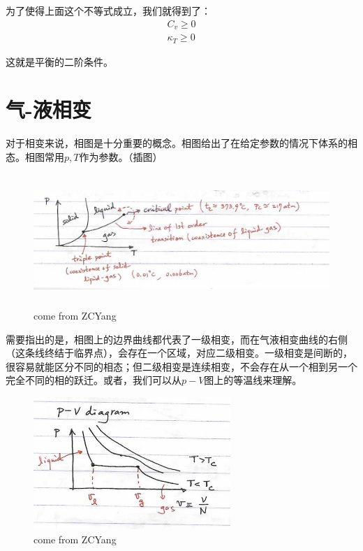 \documentclass[a4paper, 10pt, openany]{book}%
\begin{document}
 为了使得上面这个不等式成立，我们就得到了：
 \begin{align}
  C_v\geq0\\
  \kappa_T\geq0
 \end{align}

这就是平衡的二阶条件。


















\section{气-液相变}
对于相变来说，相图是十分重要的概念。相图给出了在给定参数的情况下体系的相态。相图常用$p,T$作为参数。（插图）

\begin{figure}[h]
  \centering 
  \includegraphics[height=5.0cm]{6.png}
  \caption{come from ZCYang}
\end{figure}

需要指出的是，相图上的边界曲线都代表了一级相变，而在气液相变曲线的右侧（这条线终结于临界点），会存在一个区域，对应二级相变。一级相变是间断的，很容易就能区分不同的相态；但二级相变是连续相变，不会存在从一个相到另一个完全不同的相的跃迁。或者，我们可以从$p-V$图上的等温线来理解。

\begin{figure}[ht]
  \centering 
  \includegraphics[height=5.0cm]{7.png}
  \caption{come from ZCYang}
\end{figure}
\end{document}

